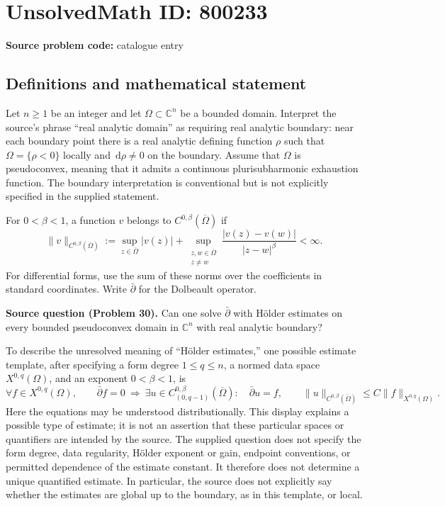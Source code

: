 \documentclass[11pt]{article}
\newcommand{\C}{\mathbb{C}}
\newcommand{\dd}{\,\mathrm{d}}
\begin{document}
\section*{UnsolvedMath ID: 800233}
\textbf{Source problem code:} catalogue entry
\subsection{Definitions and mathematical statement}
Let \(n\geq 1\) be an integer and let \(\Omega\subset\C^n\) be a bounded domain. Interpret the source's phrase ``real analytic domain'' as requiring real analytic boundary: near each boundary point there is a real analytic defining function \(\rho\) such that \(\Omega=\{\rho<0\}\) locally and \(\dd\rho\ne0\) on the boundary. Assume that \(\Omega\) is pseudoconvex, meaning that it admits a continuous plurisubharmonic exhaustion function. The boundary interpretation is conventional but is not explicitly specified in the supplied statement.

For \(0<\beta<1\), a function \(v\) belongs to \(C^{0,\beta}(\overline\Omega)\) if
\[
\|v\|_{C^{0,\beta}(\overline\Omega)}:=\sup_{z\in\overline\Omega}|v(z)|+\sup_{\substack{z,w\in\overline\Omega\\z\ne w}}\frac{|v(z)-v(w)|}{|z-w|^\beta}<\infty.
\]
For differential forms, use the sum of these norms over the coefficients in standard coordinates. Write \(\bar\partial\) for the Dolbeault operator.

\textbf{Source question (Problem 30).} Can one solve \(\bar\partial\) with H\"older estimates on every bounded pseudoconvex domain in \(\C^n\) with real analytic boundary?

To describe the unresolved meaning of ``H\"older estimates,'' one possible estimate template, after specifying a form degree \(1\leq q\leq n\), a normed data space \(X^{0,q}(\Omega)\), and an exponent \(0<\beta<1\), is
\[
\forall f\in X^{0,q}(\Omega),\qquad
\bar\partial f=0\ \Longrightarrow\ \exists u\in C^{0,\beta}_{(0,q-1)}(\overline\Omega):\quad
\bar\partial u=f,\qquad
\|u\|_{C^{0,\beta}(\overline\Omega)}\leq C\|f\|_{X^{0,q}(\Omega)}.
\]
Here the equations may be understood distributionally. This display explains a possible type of estimate; it is not an assertion that these particular spaces or quantifiers are intended by the source. The supplied question does not specify the form degree, data regularity, H\"older exponent or gain, endpoint conventions, or permitted dependence of the estimate constant. It therefore does not determine a unique quantified estimate. In particular, the source does not explicitly say whether the estimates are global up to the boundary, as in this template, or local.
\end{document}
